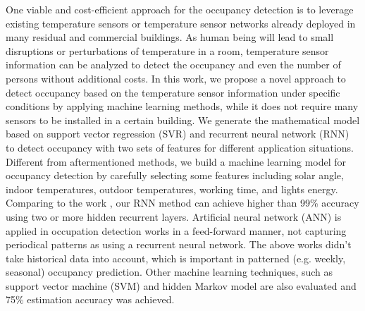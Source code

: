 One viable and cost-efficient approach for the occupancy detection is
to leverage existing temperature sensors or temperature sensor
networks already deployed in many residual and commercial
buildings. As human being will lead to small disruptions or
perturbations of temperature in a room, temperature sensor information
can be analyzed to detect the occupancy and even the number of persons
without additional costs.  
In this work, we propose a novel approach to detect occupancy based on
the temperature sensor information under specific conditions by
applying machine learning methods, while it does not require many
sensors to be installed in a certain building.  We generate the
mathematical model based on support vector regression (SVR) and
recurrent neural network (RNN) to detect occupancy with two sets of
features for different application situations.
\textcolor{feb18rev}{ Different from
  aftermentioned methods, we build a machine learning model for
  occupancy detection by carefully selecting some features including
  solar angle, indoor temperatures, outdoor temperatures, working
  time, and lights energy. Comparing to the work \cite{dong2014real},
  our RNN method can achieve higher than 99\% accuracy using two or
  more hidden recurrent layers. Artificial neural network (ANN) is
  applied in occupation detection works \cite{lam2009occupancy} in a
  feed-forward manner, not capturing periodical patterns as using a
  recurrent neural network. The above works didn't take historical data into
  account, which is important in patterned (e.g.  weekly, seasonal) occupancy
  prediction. Other machine learning techniques, such as support vector machine
  (SVM) and hidden Markov model are also evaluated and 75\% estimation accuracy
  was achieved.}
